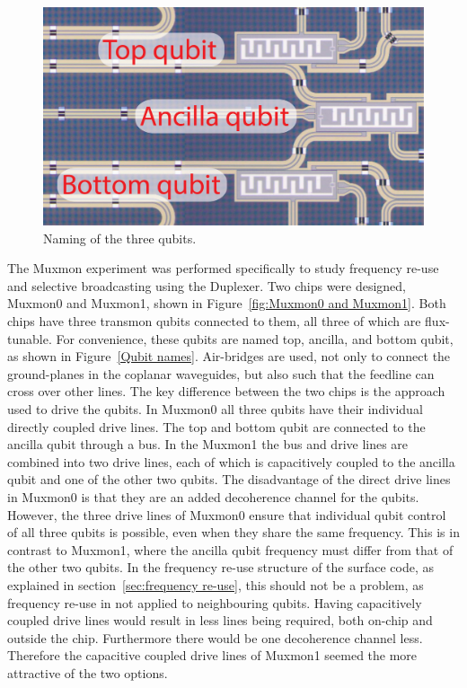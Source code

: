       \begin{figure}
        \begin{center}
        \vspace{-30pt}
          \includegraphics[width=\textwidth]{../Figures/Qubit names.jpg}
        \end{center}
        \vspace{-20 pt}
        \caption{Naming of the three qubits.}
        \label{fig:Qubit names}
      \end{figure}

      The Muxmon experiment was performed specifically to study frequency re-use and selective broadcasting using the Duplexer. Two chips were designed, Muxmon0 and Muxmon1, shown in Figure~\ref{fig:Muxmon0 and Muxmon1}. Both chips have three transmon qubits connected to them, all three of which are flux-tunable. For convenience, these qubits are named top, ancilla, and bottom qubit, as shown in Figure~\ref{Qubit names}. Air-bridges are used, not only to connect the ground-planes in the coplanar waveguides, but also such that the feedline can cross over other lines. The key difference between the two chips is the approach used to drive the qubits. In Muxmon0 all three qubits have their individual directly coupled drive lines. The top and bottom qubit are connected to the ancilla qubit through a bus. In the Muxmon1 the bus and drive lines are combined into two drive lines, each of which is capacitively coupled to the ancilla qubit and one of the other two qubits. The disadvantage of the direct drive lines in Muxmon0 is that they are an added decoherence channel for the qubits. However, the three drive lines of Muxmon0 ensure that individual qubit control of all three qubits is possible, even when they share the same frequency. This is in contrast to Muxmon1, where the ancilla qubit frequency must differ from that of the other two qubits. In the frequency re-use structure of the surface code, as explained in section~\ref{sec:frequency re-use}, this should not be a problem, as frequency re-use in not applied to neighbouring qubits. Having capacitively coupled drive lines would result in less lines being required, both on-chip and outside the chip. Furthermore there would be one decoherence channel less. Therefore the capacitive coupled drive lines of Muxmon1 seemed the more attractive of the two options.

